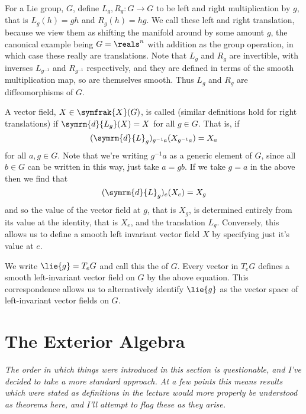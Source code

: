 \documentclass[fleqn]{NotesClass}
\renewcommand{\dl}{\symrm{d}}
\newcommand{\vectorFields}{\symfrak{X}}
\begin{document}
    For a Lie group, \(G\), define \(L_g, R_g \colon G \to G\) to be left and right multiplication by \(g\), that is \(L_g(h) = gh\) and \(R_g(h) = hg\).
    We call these left and right translation, because we view them as shifting the manifold around by some amount \(g\), the canonical example being \(G = \reals^n\) with addition as the group operation, in which case these really are translations.
    Note that \(L_g\) and \(R_g\) are invertible, with inverses \(L_{g^{-1}}\) and \(R_{g^{-1}}\) respectively, and they are defined in terms of the smooth multiplication map, so are themselves smooth.
    Thus \(L_g\) and \(R_g\) are diffeomorphisms of \(G\).
    
    A vector field, \(X \in \vectorFields(G)\), is called  (similar definitions hold for right translations) if \(\dl{L_g}(X) = X\) for all \(g \in G\).
    That is, if
    \begin{equation}
        (\dl{L}_g)_{g^{-1}a}(X_{g^{-1}a}) = X_a
    \end{equation}
    for all \(a, g \in G\).
    Note that we're writing \(g^{-1}a\) as a generic element of \(G\), since all \(b \in G\) can be written in this way, just take \(a = gb\).
    If we take \(g = a\) in the above then we find that
    \begin{equation}
        (\dl{L}_g)_e(X_e) = X_g
    \end{equation}
    and so the value of the vector field at \(g\), that is \(X_g\), is determined entirely from its value at the identity, that is \(X_e\), and the translation \(L_g\).
    Conversely, this allows us to define a smooth left invariant vector field \(X\) by specifying just it's value at \(e\).
    
    We write \(\lie{g} = T_eG\) and call this the  of \(G\).
    Every vector in \(T_eG\) defines a smooth left-invariant vector field on \(G\) by the above equation.
    This correspondence allows us to alternatively identify \(\lie{g}\) as the vector space of left-invariant vector fields on \(G\).
    
    \chapter{The Exterior Algebra}
    \textit{The order in which things were introduced in this section is questionable, and I've decided to take a more standard approach. At a few points this means results which were stated as definitions in the lecture would more properly be understood as theorems here, and I'll attempt to flag these as they arise.}
    
\end{document}
